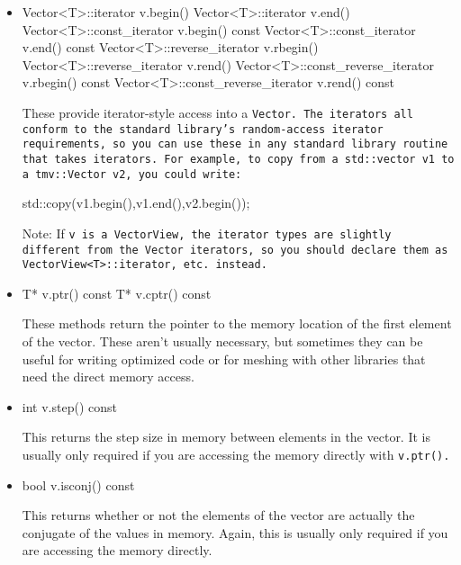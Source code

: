 \begin{itemize}
\item
\begin{tmvcode}
Vector<T>::iterator v.begin()
Vector<T>::iterator v.end()
Vector<T>::const_iterator v.begin() const
Vector<T>::const_iterator v.end() const
Vector<T>::reverse_iterator v.rbegin()
Vector<T>::reverse_iterator v.rend()
Vector<T>::const_reverse_iterator v.rbegin() const
Vector<T>::const_reverse_iterator v.rend() const
\end{tmvcode}
These provide iterator-style access into a \tt{Vector}.  The iterators all conform to the standard library's random-access iterator requirements, so you can use these in any standard library routine that takes iterators.  For example, to copy from a \tt{std::vector v1} to a \tt{tmv::Vector v2}, you could write:
\begin{tmvcode}
std::copy(v1.begin(),v1.end(),v2.begin());
\end{tmvcode}
Note: If \tt{v} is a \tt{VectorView},
the iterator types are slightly different from the \tt{Vector} iterators, 
so you should declare them as \tt{VectorView<T>::iterator},
etc. instead.

\item
\begin{tmvcode}
T* v.ptr()
const T* v.cptr() const
\end{tmvcode}
These methods return the pointer to the memory location of the first element of the vector.  These aren't usually necessary, but sometimes they can be useful for writing optimized code or for meshing with other libraries that need the direct memory access.

\item
\begin{tmvcode}
int v.step() const
\end{tmvcode}
This returns the step size in memory between elements in the vector.  It is usually only required if you are accessing the memory directly with \tt{v.ptr()}.

\item
\begin{tmvcode}
bool v.isconj() const
\end{tmvcode}
This returns whether or not the elements of the vector are actually the conjugate of the values in memory.  Again, this is usually only required if you are accessing the memory directly.

\end{itemize}

